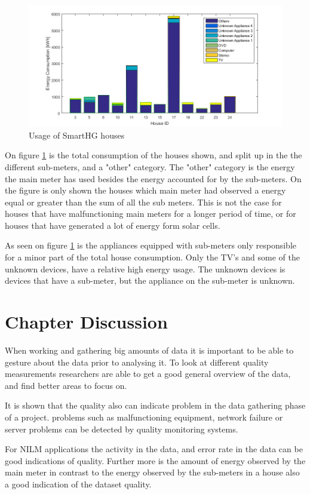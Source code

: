 \begin{figure}[H]
\centering
\includegraphics[width=1\textwidth]{billeder/SHGHouseUsagesV2.png}
\caption{Usage of SmartHG houses}
\label{fig:USAGEofSHG}
\end{figure}

On figure \ref{fig:USAGEofSHG} is the total consumption of the houses shown, and split up in the the different sub-meters, and a "other" category. The "other" category is the energy the main meter has used besides the energy accounted for by the sub-meters. On the figure is only shown the houses which main meter had observed a energy equal or greater than the sum of all the sub meters. This is not the case for houses that have malfunctioning main meters for a longer period of time, or for houses that have generated a lot of energy form solar cells. 

As seen on figure \ref{fig:USAGEofSHG} is the appliances equipped with sub-meters only responsible for a minor part of the total house consumption. Only the TV's and some of the unknown devices, have a relative high energy usage. The unknown devices is devices that have a sub-meter, but the appliance on the sub-meter is unknown.  

\section{Chapter Discussion}
When working and gathering big amounts of data it is important to be able to gesture about the data prior to analysing it. To look at different quality measurements researchers are able to get a good general overview of the data, and find better areas to focus on. 

It is shown that the quality also can indicate problem in the data gathering phase of a project. problems such as malfunctioning equipment, network failure or server problems can be detected by quality monitoring systems. 

For NILM applications the activity in the data, and error rate in the data can be good indications of quality. Further more is the amount of energy observed by the main meter in contrast to the energy observed by the sub-meters in a house also a good indication of the dataset quality. 
